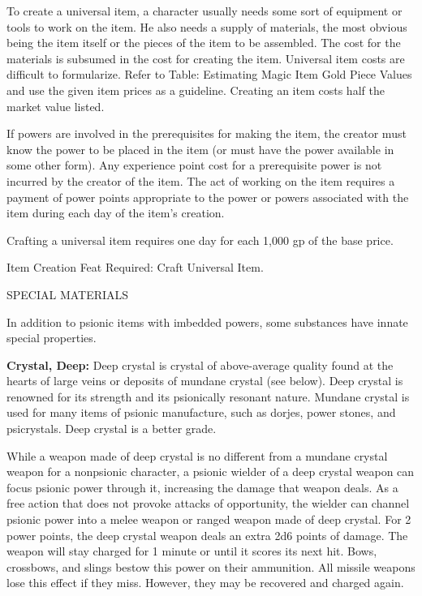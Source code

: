 \documentclass{article}
\begin{document}
To create a universal item, a character usually needs some sort of equipment or 
tools to work on the item. He also needs a supply of materials, the most obvious 
being the item itself or the pieces of the item to be assembled. The cost for the 
materials is subsumed in the cost for creating the item. Universal item costs are 
difficult to formularize. Refer to Table: Estimating Magic Item Gold Piece Values\textit{ 
}and use the given item prices as a guideline. Creating an item costs half the 
market value listed.

If powers are involved in the prerequisites for making the item, the creator must 
know the power to be placed in the item (or must have the power available in some 
other form). Any experience point cost for a prerequisite power is not incurred 
by the creator of the item. The act of working on the item requires a payment of 
power points appropriate to the power or powers associated with the item during 
each day of the item's creation.

Crafting a universal item requires one day for each 1,000 gp of the base price.

Item Creation Feat Required: Craft Universal Item.

\vspace{12pt}
{\LARGE{}SPECIAL MATERIALS}

In addition to psionic items with imbedded powers, some substances have innate 
special properties.

\textbf{Crystal, Deep: }Deep crystal is crystal of above-average quality found 
at the hearts of large veins or deposits of mundane crystal (see below). Deep crystal 
is renowned for its strength and its psionically resonant nature. Mundane crystal 
is used for many items of psionic manufacture, such as dorjes, power stones, and 
psicrystals. Deep crystal is a better grade.

While a weapon made of deep crystal is no different from a mundane crystal weapon 
for a nonpsionic character, a psionic wielder of a deep crystal weapon can focus 
psionic power through it, increasing the damage that weapon deals. As a free action 
that does not provoke attacks of opportunity, the wielder can channel psionic power 
into a melee weapon or ranged weapon made of deep crystal. For 2 power points, 
the deep crystal weapon deals an extra 2d6 points of damage. The weapon will stay 
charged for 1 minute or until it scores its next hit. Bows, crossbows, and slings 
bestow this power on their ammunition. All missile weapons lose this effect if 
they miss. However, they may be recovered and charged again.
\end{document}
